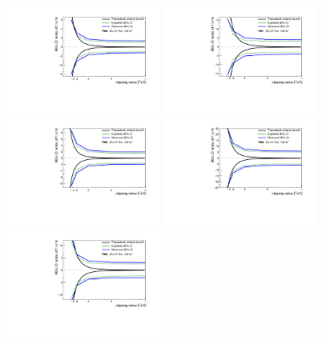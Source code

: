 \begin{figure}[ht]
   \centering
   \includegraphics[width=0.45\textwidth]{figures/aQGC/FM0limit.pdf}
   \includegraphics[width=0.45\textwidth]{figures/aQGC/FM1limit.pdf}
   \includegraphics[width=0.45\textwidth]{figures/aQGC/FM2limit.pdf}
   \includegraphics[width=0.45\textwidth]{figures/aQGC/FM3limit.pdf}
   \includegraphics[width=0.45\textwidth]{figures/aQGC/FM4limit.pdf}

\end{figure}
